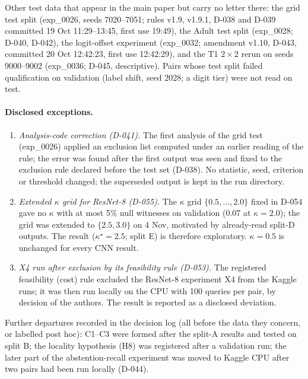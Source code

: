 \documentclass[10pt,a4paper]{article}
\theoremstyle{remark}
\begin{document}
Other test data that appear in the main paper but carry no letter there: the grid test split (exp\_0026, seeds 7020--7051; rules v1.9, v1.9.1, D-038 and D-039 committed 19 Oct 11:29--13:45, first use 19:49), the Adult test split (exp\_0028; D-040, D-042), the logit-offset experiment (exp\_0032; amendment v1.10, D-043, committed 20 Oct 12:42:23, first use 12:42:29), and the T1 $2\times2$ rerun on seeds 9000--9002 (exp\_0036; D-045, descriptive). Pairs whose test split failed qualification on validation (label shift, seed 2028; a digit tier) were not read on test.

\paragraph{Disclosed exceptions.}
\begin{enumerate}
\item \emph{Analysis-code correction (D-041).} The first analysis of the grid test (exp\_0026) applied an exclusion list computed under an earlier reading of the rule; the error was found after the first output was seen and fixed to the exclusion rule declared before the test set (D-038). No statistic, seed, criterion or threshold changed; the superseded output is kept in the run directory.
\item \emph{Extended $\kappa$ grid for ResNet-8 (D-055).} The $\kappa$ grid $\{0.5,\dots,2.0\}$ fixed in D-054 gave no $\kappa$ with at most 5\% null witnesses on validation (0.07 at $\kappa=2.0$); the grid was extended to $\{2.5,3.0\}$ on 4 Nov, motivated by already-read split-D outputs. The result ($\kappa^\star=2.5$; split E) is therefore exploratory. $\kappa=0.5$ is unchanged for every CNN result.
\item \emph{X4 run after exclusion by its feasibility rule (D-053).} The registered feasibility (cost) rule excluded the ResNet-8 experiment X4 from the Kaggle runs; it was then run locally on the CPU with 100 queries per pair, by decision of the authors. The result is reported as a disclosed deviation.
\end{enumerate}
Further departures recorded in the decision log (all before the data they concern, or labelled post hoc): C1--C3 were formed after the split-A results and tested on split B; the locality hypothesis (H8) was registered after a validation run; the later part of the abstention-recall experiment was moved to Kaggle CPU after two pairs had been run locally (D-044).
\end{document}
